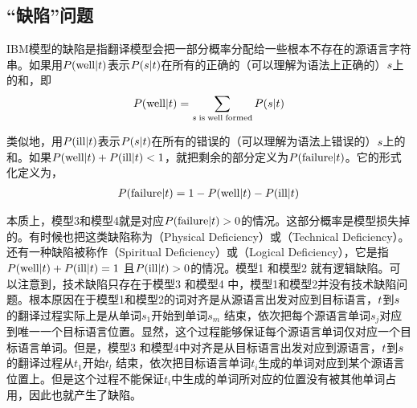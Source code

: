 
\subsection{“缺陷”问题}

\parinterval IBM模型的缺陷是指翻译模型会把一部分概率分配给一些根本不存在的源语言字符串。如果用${P}(\textrm{well}|{t})$表示${P}({s}| {t})$在所有的正确的（可以理解为语法上正确的）${s}$上的和，即
\begin{eqnarray}
{P}(\textrm{well}|{t})=\sum_{{s}\textrm{\;is\;well\;formed}}{{P}({s}| {t})}
\label{eq:6-26}
\end{eqnarray}

\parinterval 类似地，用${P}(\textrm{ill}|{t})$表示${P}({s}| {t})$在所有的错误的（可以理解为语法上错误的）${s}$上的和。如果${P}(\textrm{well}|{t})+ {P}(\textrm{ill}|{t})<1$，就把剩余的部分定义为${P}(\textrm{failure}|{t})$。它的形式化定义为，
\begin{eqnarray}
{P}({\textrm{failure}|{t}})  = 1 - {P}({\textrm{well}|{t}}) - {P}({\textrm{ill}|{t}})
\label{eq:6-27}
\end{eqnarray}

\parinterval 本质上，模型3和模型4就是对应${P}({\textrm{failure}|{t}})>0$的情况。这部分概率是模型损失掉的。有时候也把这类缺陷称为{\small{}}（Physical Deficiency）或{\small{}}（Technical Deficiency）。还有一种缺陷被称作{\small{}}（Spiritual Deficiency）或{\small{}}（Logical Deficiency），它是指${P}({\textrm{well}|{t}}) + {P}({\textrm{ill}|{t}}) = 1$ 且${P}({\textrm{ill}|{t}}) > 0$的情况。模型1 和模型2 就有逻辑缺陷。可以注意到，技术缺陷只存在于模型3 和模型4 中，模型1和模型2并没有技术缺陷问题。根本原因在于模型1和模型2的词对齐是从源语言出发对应到目标语言，${t}$到${s}$ 的翻译过程实际上是从单词$s_1$开始到单词$s_m$ 结束，依次把每个源语言单词$s_j$对应到唯一一个目标语言位置。显然，这个过程能够保证每个源语言单词仅对应一个目标语言单词。但是，模型3 和模型4中对齐是从目标语言出发对应到源语言，${t}$到${s}$的翻译过程从$t_1$开始$t_l$ 结束，依次把目标语言单词$t_i$生成的单词对应到某个源语言位置上。但是这个过程不能保证$t_i$中生成的单词所对应的位置没有被其他单词占用，因此也就产生了缺陷。

